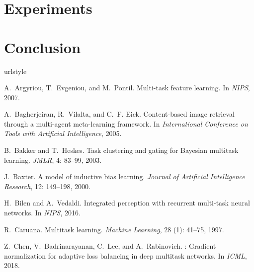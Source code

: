 \documentclass{article}
\begin{document}
\section{Experiments}
\label{sec:experiments}



\section{Conclusion}
\label{sec:conclusion}




\clearpage

{\small


\begin{thebibliography}{60}
\providecommand{\natexlab}[1]{#1}
\providecommand{\url}[1]{\texttt{#1}}
\expandafter\ifx\csname urlstyle\endcsname\relax
  \providecommand{\doi}[1]{doi: #1}\else
  \providecommand{\doi}{doi: \begingroup \urlstyle{rm}\Url}\fi

A.~Argyriou, T.~Evgeniou, and M.~Pontil.
\newblock Multi-task feature learning.
\newblock In \emph{NIPS}, 2007.

A.~Bagherjeiran, R.~Vilalta, and C.~F. Eick.
\newblock Content-based image retrieval through a multi-agent meta-learning
  framework.
\newblock In \emph{International Conference on Tools with Artificial
  Intelligence}, 2005.

B.~Bakker and T.~Heskes.
\newblock Task clustering and gating for {Bayesian} multitask learning.
\newblock \emph{JMLR}, 4: 83--99, 2003.

J.~Baxter.
\newblock A model of inductive bias learning.
\newblock \emph{Journal of Artificial Intelligence Research}, 12:
  149--198, 2000.

H.~Bilen and A.~Vedaldi.
\newblock Integrated perception with recurrent multi-task neural networks.
\newblock In \emph{NIPS}, 2016.

R.~Caruana.
\newblock Multitask learning.
\newblock \emph{Machine Learning}, 28 (1): 41--75, 1997.

Z.~Chen, V.~Badrinarayanan, C.~Lee, and A.~Rabinovich.
: Gradient normalization for adaptive loss balancing in
  deep multitask networks.
\newblock In \emph{{ICML}}, 2018.


\end{thebibliography}}
\end{document}
